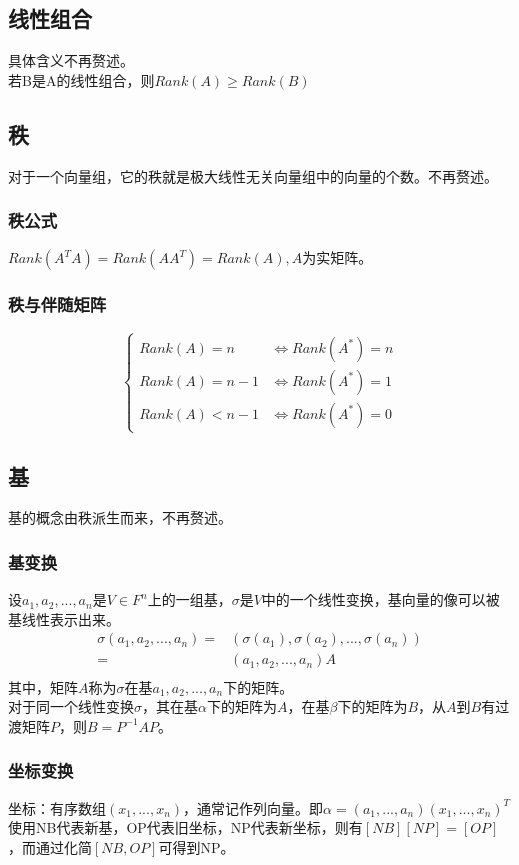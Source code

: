\documentclass[UTF8]{ctexart}
\begin{document}
\subsection{线性组合}
具体含义不再赘述。\\
\indent
若B是A的线性组合，则$Rank(A)\geq Rank(B)$
\subsection{秩}
对于一个向量组，它的秩就是极大线性无关向量组中的向量的个数。不再赘述。
\subsubsection{秩公式}
$Rank(A^{T}A)=Rank(AA^{T})=Rank(A),A$为实矩阵。
\subsubsection{秩与伴随矩阵}
\begin{equation*}
	\begin{cases}
		Rank(A)=n &\Leftrightarrow Rank(A^{*})=n\\
		Rank(A)=n-1 &\Leftrightarrow Rank(A^{*})=1\\
		Rank(A)<n-1 &\Leftrightarrow Rank(A^{*})=0
	\end{cases}
\end{equation*}
\subsection{基}
基的概念由秩派生而来，不再赘述。
\subsubsection{基变换}
设$a_1,a_2,...,a_n$是$V \in F^{n}$上的一组基，$\sigma$是$V$中的一个线性变换，基向量的像可以被基线性表示出来。
\[\begin{split}
\sigma(a_1,a_2,...,a_n) = & (\sigma(a_1),\sigma(a_2),...,\sigma(a_n))    \\
= &(a_1,a_2,...,a_n)A \\
\end{split}\]
其中，矩阵$A$称为$\sigma$在基$a_1,a_2,...,a_n$下的矩阵。\\
\indent
对于同一个线性变换$\sigma$，其在基$\alpha$下的矩阵为$\mathit{A}$，在基$\beta$下的矩阵为$\mathit{B}$，从$\mathit{A}$到$\mathit{B}$有过渡矩阵$\mathit{P}$，则$\mathit{B}=\mathit{P^{-1}AP}$。
\subsubsection{坐标变换}
坐标：有序数组$(x_1,...,x_n)$，通常记作列向量。即$\alpha=(a_1,...,a_n)(x_1,...,x_n)^T$\\
\indent
使用NB代表新基，OP代表旧坐标，NP代表新坐标，则有$[NB][NP]=[OP]$，而通过化简$[NB,OP]$可得到NP。
\end{document}
